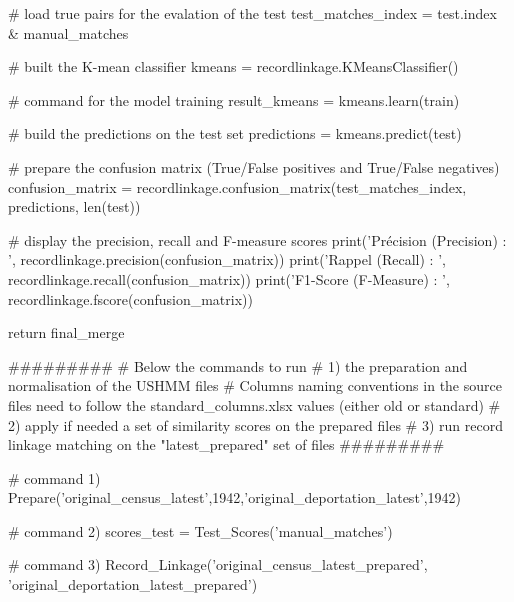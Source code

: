\documentclass[a4paper,12pt,twoside]{book}
\begin{document}
\begin{python}
  # load true pairs for the evalation of the test
  test_matches_index = test.index & manual_matches

  # built the K-mean classifier
  kmeans = recordlinkage.KMeansClassifier()

  # command for the model training
  result_kmeans = kmeans.learn(train)

  # build the predictions on the test set
  predictions = kmeans.predict(test)

  # prepare the confusion matrix (True/False positives and True/False negatives)
  confusion_matrix = recordlinkage.confusion_matrix(test_matches_index, predictions, len(test))

  # display the precision, recall and F-measure scores
  print('Précision (Precision) : ', recordlinkage.precision(confusion_matrix))
  print('Rappel (Recall) : ', recordlinkage.recall(confusion_matrix))
  print('F1-Score (F-Measure) : ', recordlinkage.fscore(confusion_matrix))

  return final_merge


#########
# Below the commands to run 
# 1) the preparation and normalisation of the USHMM files
# Columns naming conventions in the source files need to follow the standard_columns.xlsx values (either old or standard)
# 2) apply if needed a set of similarity scores on the prepared files
# 3) run record linkage matching on the "latest_prepared" set of files
#########

# command 1)
Prepare('original_census_latest',1942,'original_deportation_latest',1942)

# command 2)
scores_test = Test_Scores('manual_matches')

# command 3)
Record_Linkage('original_census_latest_prepared', 'original_deportation_latest_prepared')





    		    \end{python}

      	

	\pagestyle{empty}				
	\cleardoublepage
	\pagestyle{plain}					
	

	\printbibheading[heading=bibintoc,title={Bibliographie}]
	
\end{document}
